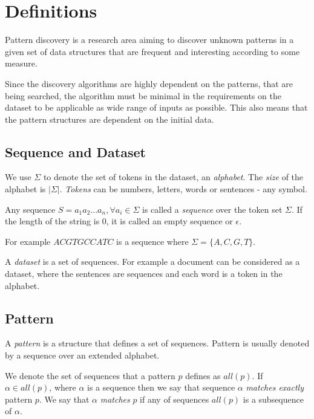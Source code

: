 \chapter{Definitions}

Pattern discovery is a research area aiming to discover unknown patterns
in a given set of data structures that are frequent and interesting according 
to some measure.

Since the discovery algorithms are highly dependent on the patterns, that are being searched, the algorithm must be minimal in the requirements on the dataset to be applicable as wide range of inputs as possible. This also means that the pattern structures are dependent on the initial data. \eg

\section{Sequence and Dataset}

We use $\Sigma$ to denote the set of tokens in the dataset, an \emph{alphabet}. 
The \emph{size} of the alphabet is $|\Sigma|$. \emph{Tokens} can be numbers, 
letters, words or sentences - any symbol.

Any sequence $S=a_1 a_2 ... a_n, \forall a_i \in \Sigma$ is called a \emph{sequence} 
over the token set $\Sigma$. If the length of the
string is $0$, it is called an empty sequence or $\epsilon$.

For example $ACGTGCCATC$ is a sequence where $\Sigma = \{A, C, G, T\}$.

A \emph{dataset} is a set of sequences. For example a document can be considered as a dataset, where the sentences are sequences and each word is a token in the alphabet. \eg

\section{Pattern}


A \emph{pattern} is a structure that defines a set of sequences. 
Pattern is usually denoted by a sequence over an extended alphabet. \eg


We denote the set of sequences that a pattern $p$ defines as $all(p)$.
If $\alpha \in all(p)$, where $\alpha$ is a sequence then we say that
sequence $\alpha$ \emph{matches exactly} pattern $p$. We say that $\alpha$
\emph{matches} $p$ if any of sequences $all(p)$ is a subsequence of $\alpha$.

